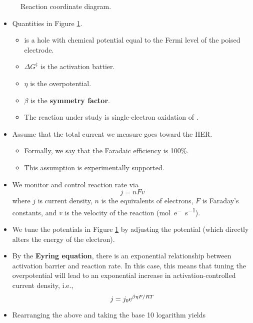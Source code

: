 \documentclass[../notes.tex]{subfiles}
\begin{document}
\begin{itemize}
\begin{figure}[h!]
        \caption{Reaction coordinate diagram.}
        \label{fig:EChemRCD}
    \end{figure}
    \begin{itemize}
        \item Quantities in Figure \ref{fig:EChemRCD}.
        \begin{itemize}
            \item {} is a hole with chemical potential equal to the Fermi level of the poised electrode.
            \item $\Delta G^\ddagger$ is the activation battier.
            \item $\eta$ is the overpotential.
            \item $\beta$ is the \textbf{symmetry factor}.
            \item The reaction under study is single-electron oxidation of .
        \end{itemize}
        \item Assume that the total current we measure goes toward the HER.
        \begin{itemize}
            \item Formally, we say that the Faradaic efficiency is 100\%.
            \item This assumption is experimentally supported.
        \end{itemize}
        \item We monitor and control reaction rate via
        \begin{equation*}
            j = nFv
        \end{equation*}
        where $j$ is current density, $n$ is the equivalents of electrons, $F$ is Faraday's constants, and $v$ is the velocity of the reaction (\si{mol.e^-\per\second}).
        \item We tune the potentials in Figure \ref{fig:EChemRCD} by adjusting the potential (which directly alters the energy of the electron).
        \item By the \textbf{Eyring equation}, there is an exponential relationship between activation barrier and reaction rate. In this case, this means that tuning the overpotential will lead to an exponential increase in activation-controlled current density, i.e.,
        \begin{equation*}
            j = j_0\e[\beta\eta F/RT]
        \end{equation*}
        \item Rearranging the above and taking the base 10 logarithm yields

\end{itemize}
\end{itemize}
\end{document}
